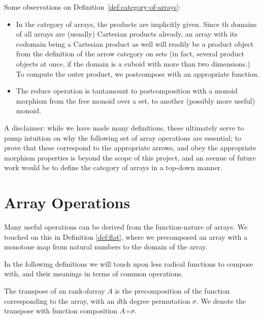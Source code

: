 \documentclass{DIKU-report-variant}
\begin{document}
\begin{observation}
  \label{ob:category-of-arrays}
  Some observations on Definition~\ref{def:category-of-arrays}:
  \begin{itemize}
    \item In the category of arrays, the products are implicitly given. Since th domains
      of all arrays are (usually) Cartesian products already, an array with its codomain being
      a Cartesian product as well will readily be a product object from the definition of
      the arrow category on sets (in fact, several product objects
      at once, if the domain is a cuboid with more than two dimensions.) To compute the outer
      product, we postcompose with an appropriate function.

    \item The reduce operation is tantamount to postcomposition with a
      monoid morphism from the free monoid over a set, to another (possibly more useful) monoid.
  \end{itemize}
\end{observation}

A disclaimer: while we have made many definitions, these ultimately
serve to pump intuition on why the following set of array operations
are essential; to prove that these correspond to the appropriate arrows,
and obey the appropriate morphism properties is beyond the scope of this
project, and an avenue of future work would be to define the category of
arrays in a top-down manner.

\section{Array Operations}
\label{sec:array-operations}

\begin{remark}
  \label{rem:functions}
  Many useful operations can be derived from the function-nature of arrays. We touched
  on this in Definition \ref{def:flat}, where we precomposed an array with a monotone map
  from natural numbers to the domain of the array.

  In the following definitions we will touch upon less radical functions
  to compose with, and their meanings in terms of common operations.
\end{remark}

\begin{definition}
  \label{def:transpose}
  The transpose of an rank-\(d\)array \(A\) is the precomposition
  of the function corresponding to the array, with an \(d\)th degree permutation \(\sigma\).
  We denote the transpose with function composition \(A \circ \sigma\).
\end{definition}
\end{document}

